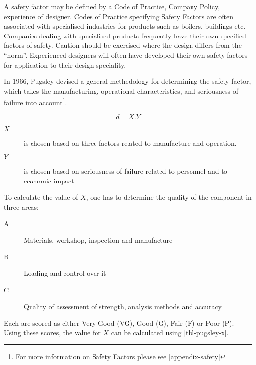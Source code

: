 A safety factor may be defined by a Code of Practice, Company Policy, experience of designer. Codes of Practice specifying Safety Factors are often associated with specialised industries for products such as boilers, buildings etc. Companies dealing with specialised products frequently have their own specified factors of safety. Caution should be exercised where the design differs from the ``norm''. Experienced designers will often have developed their own safety factors for application to their design speciality.


In 1966, Pugsley  devised a general methodology for determining the safety factor, which takes the manufacturing, operational characteristics, and seriousness of failure into account\footnote{For more information on Safety Factors please see \cref{appendix-safety}}.

\begin{equation}
    d = X.Y
\end{equation}

\begin{description}
    \item[\(X\)] is chosen based on three factors related to manufacture and operation.
    \item[\(Y\)] is chosen based on seriousness of failure related to personnel and to economic impact.
\end{description}

To calculate the value of \(X\), one has to determine the quality of the component in three areas:

\begin{description}
    \item[A] Materials, workshop, inspection and manufacture
    \item[B] Loading and control over it
    \item[C] Quality of assessment of strength, analysis methods and accuracy
\end{description}

Each are scored as either Very Good (VG), Good (G), Fair (F) or Poor (P). Using these scores, the value for \(X\) can be calculated using \cref{tbl-pugsley-x}.

